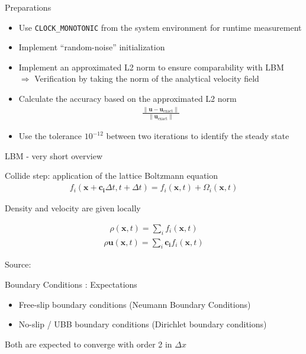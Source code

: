 \documentclass[aspectratio=43,t]{beamer}
\begin{document}
\begin{frame}{Preparations}
\begin{itemize}
	\item Use  \texttt{CLOCK\_MONOTONIC} from the system environment for runtime measurement
	\item Implement \enquote{random-noise} initialization 
	\item Implement an approximated L2 norm to ensure comparability with LBM\\
		$\Rightarrow$ Verification by taking the norm of the analytical velocity field 
	\item Calculate the accuracy based on the approximated L2 norm
		\begin{align*}
			\frac{\lVert \bm{u}-\bm{u}_{\text{exact}} \rVert}{\lVert \bm{u}_{\text{exact}} \rVert}
		\end{align*}
	\item Use the tolerance $10^{-12}$ between two iterations to identify the steady state
\end{itemize}
\end{frame}


\begin{frame}{LBM - very short overview}
	\begin{block} 
		\centering
		
		Collide step: application of the lattice Boltzmann equation
	\begin{align*}	
	f_i(\bm{x} + \bm{c_i}\Delta t, t + \Delta t) = f_i(\bm{x}, t) + \Omega_i(\bm{x}, t)
	\end{align*}
	\end{block}	
	\pause
	Density and velocity are given locally
	
		\begin{align*}
		\rho(\bm{x}, t) = \sum_i f_i(\bm{x},t)
		\end{align*}
		\begin{align*}
		\rho \bm{u}(\bm{x}, t) = \sum_i \bm{c_i} f_i(\bm{x},t)
		\end{align*}
		
		Source: \cite{kruger.2016}
\end{frame}
\begin{frame}{Boundary Conditions : Expectations}
	\begin{block}
		
	\begin{itemize}
		\item Free-slip boundary conditions (Neumann Boundary Conditions)
		\item No-slip / UBB boundary conditions (Dirichlet boundary conditions)
	\end{itemize}
	\pause
	\centering
	Both are expected to converge with order 2 in $\Delta x$
	\end{block}
\end{frame}
\end{document}
